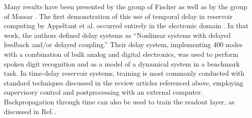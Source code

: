 Many results have been presented by the group of Fischer \cite{apso2011,laso2012,orso2015,brfi2015,brso2013,bubr2017,buma2018,brpe2018} as well as by the group of Massar \cite{padu2012,dusc2012,anha2017}. The first demonstration of this use of temporal delay in reservoir computing by Appeltant et al. occurred entirely in the electronic domain \cite{apso2011}. In that work, the authors defined delay systems as ``Nonlinear systems with delayed feedback and/or delayed coupling.'' Their delay system, implementing 400 nodes with a combination of bulk analog and digital electronics, was used to perform spoken digit recognition and as a model of a dynamical system in a benchmark task. In time-delay reservoir systems, training is most commonly conducted with standard techniques discussed in the review articles referenced above, employing supervisory control and postprocessing with an external computer. Backpropagation through time can also be used to train the readout layer, as discussed in Ref.\,.

